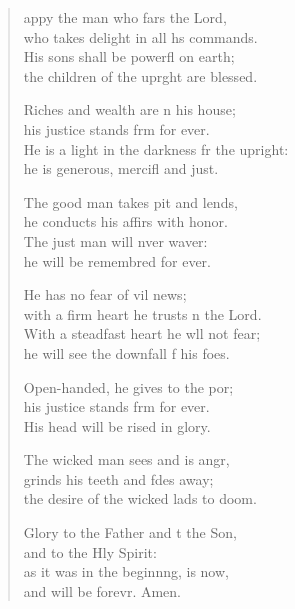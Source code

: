 \settowidth{\versewidth}{He is a light in the darkness for the upright: *}
\begin{verse}%
  \begin{patverse}
appy the man who fars the Lord,\Med\\
who takes delight in all h\pointup{\i}s commands.\\
His sons shall be powerfl on earth;\Med\\
the children of the upr\pointup{\i}ght are blessed.

Riches and wealth are \pointup{\i}n his house;\Med\\
his justice stands f\pointup{\i}rm for ever.\\
He is a light in the darkness fr the upright:\Med\\
he is generous, mercifl and just.

The good man takes pit and lends,\Med\\
he conducts his affirs with honor.\\
The just man will nver waver:\Med\\
he will be remembred for ever.

He has no fear of vil news;\Med\\
with a firm heart he trusts \pointup{\i}n the Lord.\\
With a steadfast heart he w\pointup{\i}ll not fear;\Med\\
he will see the downfall f his foes.

Open-handed, he gives to the por;\Flex\\
his justice stands f\pointup{\i}rm for ever.\Med\\
His head will be rised in glory.

The wicked man sees and is angr,\Flex\\
grinds his teeth and fdes away;\Med\\
the desire of the wicked lads to doom.

Glory to the Father and t the Son,\Med\\
and to the Hly Spirit:\\
as it was in the beginn\pointup{\i}ng, is now,\Med\\
and will be forevr. Amen. 
  \end{patverse}
\end{verse}

